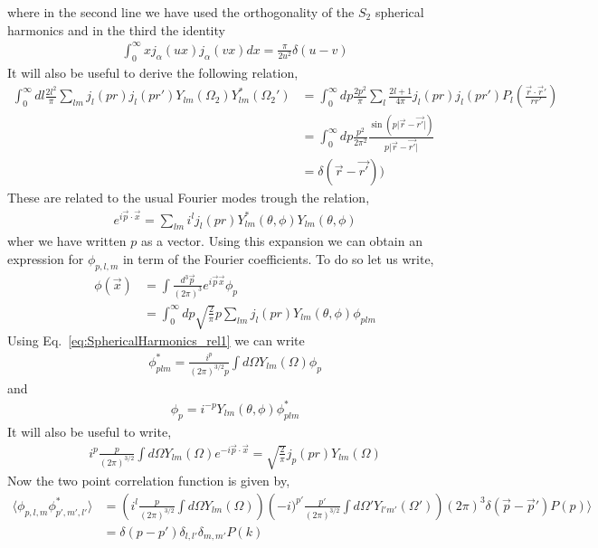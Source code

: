 \documentclass[a4paper,11pt]{article}
\numberwithin{equation}{section}
\numberwithin{equation}{section}
\begin{document}
where in the second line we have used the orthogonality of the $S_2$ spherical harmonics and in the third the identity 
\begin{align}
\int_0^{\infty}x j_\alpha(ux)j_\alpha(vx)dx=\frac{\pi}{2u^2}\delta(u-v)
\end{align}
It will also be useful to derive the following relation,
\begin{align}
\int_0^{\infty}dl \frac{2l^2}{\pi} \sum_{lm}j_l(p r)j_{l}(pr')Y_{lm}(\Omega_2)Y^*_{lm}(\Omega_2')&=\int_0^{\infty}dp \frac{2p^2}{\pi} \sum_{l}\frac{2l+1}{4\pi}j_l(p r)j_l(p r')P_l\left(\frac{\vec{r}\cdot\vec{r}'}{rr'}\right)\nonumber\\
&=\int_0^{\infty}dp\frac{p^2}{2\pi^2}\frac{\sin (p\vert\vec{r}-\vec{r'}\vert)}{p\vert\vec{r}-\vec{r'}\vert}\nonumber\\
&=\delta(\vec{r}-\vec{r'}))
\end{align}
These are related to the usual Fourier modes trough the relation,
\begin{align}
e^{i\vec{p}\cdot\vec{x}}=\sum_{lm}i^l j_l(p r)Y^*_{lm}(\theta,\phi)Y_{lm}(\theta,\phi)
\label{eq:SphericalHarmonics_rel1}
\end{align}
wher we have written $p$ as a vector. 
Using this expansion we can obtain an expression for $\phi_{p,l,m}$ in term of the Fourier coefficients. To do so let us write,
\begin{align}
\phi(\vec{x})&=\int\frac{ d^3\vec{p}}{(2\pi)^3}e^{i\vec{p}\vec{x}}\phi_p\nonumber\\
&=\int _0^{\infty}dp \sqrt{\frac{2}{\pi}}p\sum_{lm}j_l(pr)Y_{lm}(\theta,\phi)\phi_{plm}
\end{align}
Using Eq.~\eqref{eq:SphericalHarmonics_rel1} we can write
\begin{align}
\phi^*_{plm}=\frac{i^p}{(2\pi)^{3/2}p}\int d\Omega Y_{lm}(\Omega)\phi_p
\end{align}
and
\begin{align}
\phi_p=i^{-p} Y_{lm}(\theta,\phi)\phi^*_{plm}
\end{align}
It will also be useful to write, 
\begin{align}
i^p\frac{p}{(2\pi)^{3/2}}\int d\Omega Y_{lm}(\Omega)e^{-i\vec{p}\cdot\vec{x}}=\sqrt{\frac{2}{\pi}}j_p(pr)Y_{lm}(\Omega)
\end{align}
Now the two point correlation function is given by,
\begin{align}
\langle\phi_{p,l,m}\phi^*_{p',m',l'}\rangle&=\left(i^l\frac{p}{(2\pi)^{3/2}}\int d\Omega Y_{lm}(\Omega)\right)\left(-i)^{p'}\frac{p'}{(2\pi)^{3/2}}\int d\Omega' Y_{l'm'}(\Omega')\right)(2\pi)^3\delta(\vec{p}-\vec{p}')P(p)\rangle\nonumber\\
&=\delta(p-p')\delta_{l,l'}\delta_{m,m'}P(k)
\end{align}
\end{document}
